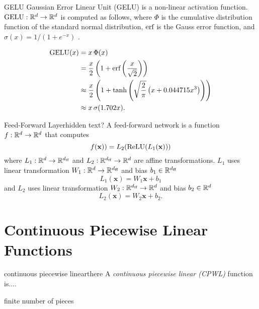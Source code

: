 \begin{definition}{GELU}{}
    Gaussian Error Linear Unit (GELU) is a non-linear activation function. $\text{GELU} : \mathbb{R}^d\to \mathbb{R}^d$ is computed as follows, where $\Phi$ is the cumulative distribution function of the standard normal distribution, $\text{erf}$ is the Gauss error function, and $\sigma(x) = 1/(1+e^{-x})$ \cite{hendrycks2023}.

    \begin{align}
        \text{GELU}(x) &= x\,\Phi(x) \\
        &= \frac{x}{2} \left(1 + \text{erf}\left(\frac{x}{\sqrt{2}}\right)\right) \\
        \label{eq:gelu}
        &\approx \frac{x}{2} \left(1 + \tanh\left(\sqrt{\frac{2}{\pi}} \left(x + 0.044715x^3\right)\right)\right) \\
        &\approx x\,\sigma(1.702 x).
    \end{align}
\end{definition}

\begin{definition}{Feed-Forward Layer}{hidden text?}
    A feed-forward network is a function $f:\mathbb{R}^d\to \mathbb{R}^d$ that computes
    \[f(\mathbf{x})) = L_2(\text{ReLU}(L_1(\mathbf{x})))\]
    where $L_1: \mathbb{R}^d \to \mathbb{R}^{d_{\text{ff}}}$ and $L_2: \mathbb{R}^{d_{\text{ff}}} \to \mathbb{R}^{d}$ are affine transformations. $L_1$ uses linear transformation $W_1:\mathbb{R}^d\to \mathbb{R}^{d_{\text{ff}}}$ and bias $b_1\in\mathbb{R}^{d_{\text{ff}}}$
    \[L_1(\mathbf{x}) = W_1 \mathbf{x} + b_1\]
    and $L_2$ uses linear transformation $W_2:\mathbb{R}^{d_{\text{ff}}}\to \mathbb{R}^d$ and bias $b_2\in\mathbb{R}^{d}$
    \[L_2(\mathbf{x}) = W_2 \mathbf{x} + b_2.\]
\end{definition}

\section{Continuous Piecewise Linear Functions}

\begin{definition}{continuous piecewise linear}{there}
A \emph{continuous piecewise linear (CPWL)} function is....

finite number of pieces
\end{definition}

